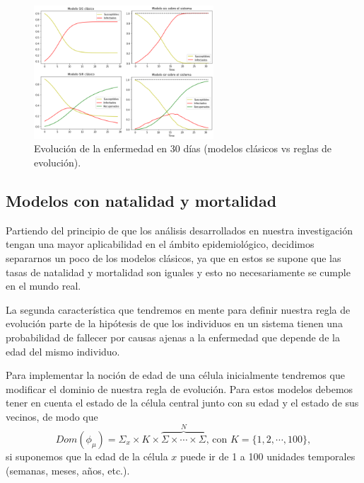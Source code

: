 \begin{example}
\begin{figure}[h]
  \centering
    \includegraphics[width=0.6\textwidth]{Imagenes/solucionesSISySIR1.PNG}
    \caption{Evolución de la enfermedad en 30 días (modelos clásicos vs reglas de evolución).}
    \label{fig:sirEn30}
\end{figure}
\end{example}

\subsection{Modelos con natalidad y mortalidad}\label{sub:NatalidadyMortalidad}
Partiendo del principio de que los análisis desarrollados en nuestra investigación tengan una mayor aplicabilidad en el ámbito epidemiológico, decidimos separarnos un poco de los modelos clásicos, ya que en estos se supone que las tasas de natalidad y mortalidad son iguales y esto no necesariamente se cumple en el mundo real.

La segunda característica que tendremos en mente para definir nuestra regla de evolución parte de la hipótesis de que los individuos en un sistema tienen una probabilidad de fallecer por causas ajenas a la enfermedad que depende de la edad del mismo individuo.

Para implementar la noción de edad de una célula inicialmente tendremos que modificar el dominio de nuestra regla de evolución. Para estos modelos debemos tener en cuenta el estado de la célula central junto con su edad y el estado de sus vecinos, de modo que 
$$Dom(\phi_\mu)=\Sigma_x\times K\times\overbrace{\Sigma\times\cdots\times\Sigma}^N\text{, con }K=\{1,2,\cdots,100\},$$
si suponemos que la edad de la célula $x$ puede ir de 1 a 100 unidades temporales (semanas, meses, años, etc.).

